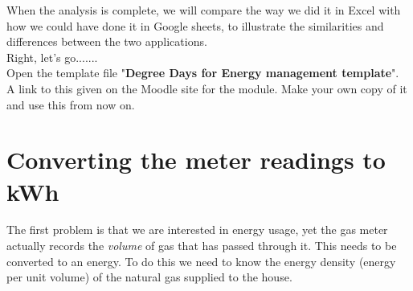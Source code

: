\documentclass{article}
\begin{document}
When the analysis is complete, we will compare the way we did it in Excel with how we could have done it in Google sheets, to illustrate the similarities and differences between the two applications.\\

Right, let's go.......\\

Open the template file "\textbf{Degree Days for Energy management template}".\\

A link to this given on the Moodle site for the module. Make your own copy of it and use this from now on.\\

\section{Converting the meter readings to kWh}
The first problem is that we are interested in energy usage, yet the gas meter actually records the \textit{volume} of gas that has passed through it. This needs to be converted to an energy. To do this we need to know the energy density (energy per unit volume) of the natural gas supplied to the house.
\end{document}
